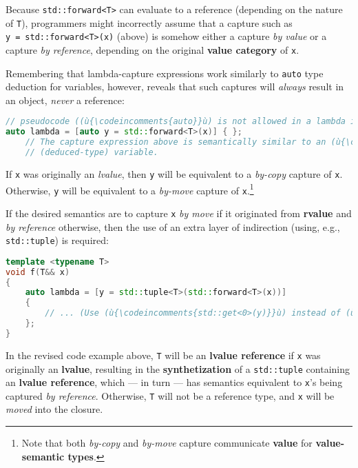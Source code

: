 \noindent Because \texttt{std::forward<T>} can evaluate to a reference (depending
on the nature of \texttt{T}), programmers might incorrectly assume that
a capture such as \texttt{y}~\texttt{=}~\texttt{std::forward<T>(x)}
(above) is somehow either a capture \emph{by value} or a capture
\emph{by reference}, depending on the original \textbf{value category}
of \texttt{x}.

Remembering that lambda-capture expressions work similarly to
\texttt{auto} type deduction for variables, however,
reveals that such captures will \emph{always} result in an object, \emph{never} a reference:

\begin{lstlisting}[language=C++]
// pseudocode ((ù{\codeincomments{auto}}ù) is not allowed in a lambda introducer.)
auto lambda = [auto y = std::forward<T>(x)] { };
    // The capture expression above is semantically similar to an (ù{\codeincomments{auto}}ù)
    // (deduced-type) variable.
\end{lstlisting}

\noindent If \texttt{x} was originally an \emph{lvalue}, then \texttt{y} will be
equivalent to a \emph{by-copy} capture of \texttt{x}. Otherwise,
\texttt{y} will be equivalent to a \emph{by-move} capture of
\texttt{x}.{\cprotect\footnote{Note that both \emph{by-copy} and
\emph{by-move} capture communicate \textbf{value} for
  \textbf{value-semantic types}.}}

If the desired semantics are to capture \texttt{x} \emph{by move} if it
originated from \textbf{rvalue} and \emph{by reference} otherwise, then
the use of an extra layer of indirection (using, e.g.,
\texttt{std::tuple}) is required:

\begin{lstlisting}[language=C++]
template <typename T>
void f(T&& x)
{
    auto lambda = [y = std::tuple<T>(std::forward<T>(x))]
    {
        // ... (Use (ù{\codeincomments{std::get<0>(y)}}ù) instead of (ù{\codeincomments{y}}ù) in this lambda body.)
    };
}
\end{lstlisting}

\noindent In the revised code example above, \texttt{T} will be an \textbf{lvalue
reference} if \texttt{x} was originally an \textbf{lvalue}, resulting in
the \textbf{synthetization} of a \texttt{std::tuple} containing an
\textbf{lvalue reference}, which --- in turn --- has semantics
equivalent to \texttt{x}'s being captured \emph{by reference}.
Otherwise, \texttt{T} will not be a reference type, and \texttt{x} will
be \emph{moved} into the closure.


